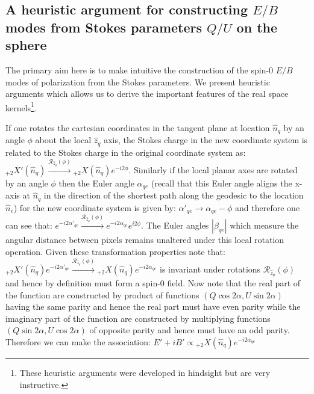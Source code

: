 \subsection{A heuristic argument for constructing  $E/B$ modes from Stokes parameters $Q/U$ on the sphere} \label{sec:qu2eb_heuristic}
The primary aim here is to make intuitive the construction of the spin-0 $E/B$ modes of polarization from the Stokes parameters. We present heuristic arguments which allows us to derive the important features of the real space kernels\footnote{These heuristic arguments were developed in hindsight but are very instructive.}. 

If one rotates the cartesian coordinates in the tangent plane at location $\hat{n}_q$ by an angle $\phi$ about the local $\hat{z}_q$ axis, the Stokes charge in the new coordinate system is related to the Stokes charge in the original coordinate system as: ${}_{+2}X'(\hat{n}_q) \xrightarrow{\mathcal{R}_{\hat{z}_q}(\phi)} {}_{+2}X(\hat{n}_q) e^{-i2\phi} $. Similarly if the local planar axes are rotated by an angle $\phi$ then the Euler angle $\alpha_{qe}$ (recall that this Euler angle aligns the x-axis at $\hat{n}_q$ in the direction of the shortest path along the geodesic to the location $\hat{n}_e$) for the new coordinate system is given by: $\alpha'_{qe} \rightarrow \alpha_{qe} - \phi$ and therefore one can see that: $e^{-i2\alpha'_{qe}} \xrightarrow{\mathcal{R}_{\hat{z}_q}(\phi)} e^{-i2\alpha_{qe}} e^{i2\phi}$. The Euler angles $|\beta_{qe}|$ which measure the angular distance between pixels remains unaltered under this local rotation operation.  Given these transformation properties note that: ${}_{+2}X'(\hat{n}_q)e^{-i2\alpha'_{qe}} \xrightarrow{\mathcal{R}_{\hat{z}_q}(\phi)} {}_{+2}X(\hat{n}_q) e^{-i2\alpha_{qe}}$ is invariant under rotations  $\mathcal{R}_{\hat{z}_q}(\phi)$ and hence by definition must form a spin-0 field.  Now note that the real part of the function are constructed by product of functions $(Q\cos{2\alpha}, U\sin{2 \alpha})$ having the same parity and hence the real part must have even parity while the imaginary part of the function are constructed by multiplying functions $(Q\sin{2 \alpha}, U\cos{2\alpha})$ of opposite parity and hence must have an odd parity. Therefore we can make the association: $E'+iB' \propto {}_{+2}X(\hat{n}_q) e^{-i2\alpha_{qe}}$


